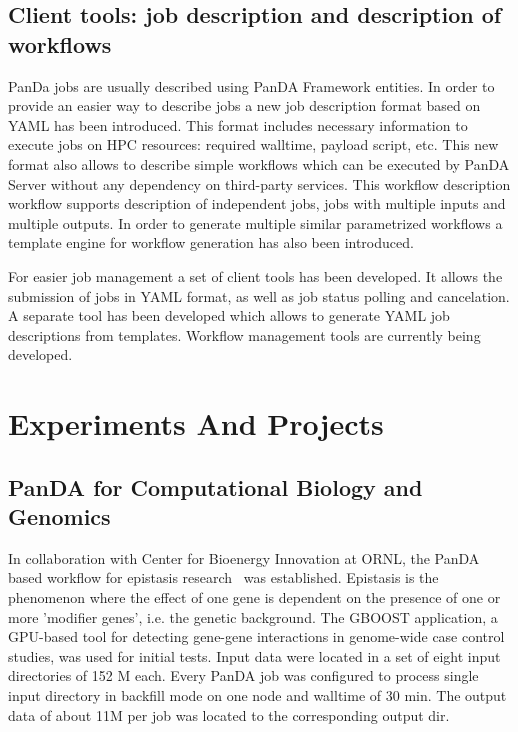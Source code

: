 \documentclass{webofc}
\begin{document}
\subsection{Client tools: job description and description of workflows}

PanDa jobs are usually described using PanDA Framework entities. In order to provide an easier way to describe jobs a new job description format based on YAML has been introduced. This format includes necessary information to execute jobs on HPC resources: required walltime, payload script, etc. This new format also allows to describe simple workflows which can be executed by PanDA Server without any dependency on third-party services. This workflow description workflow supports description of independent jobs, jobs with multiple inputs and multiple outputs. In order to generate multiple similar parametrized workflows a template engine for workflow generation has also been introduced.

For easier job management a set of client tools has been developed. It allows the submission of jobs in YAML format, as well as job status polling and cancelation. A separate tool has been developed which allows to generate YAML job descriptions from templates. Workflow management tools are currently being developed.



\section{Experiments And Projects}
\subsection{PanDA for Computational Biology and Genomics}

In collaboration with Center for Bioenergy Innovation at ORNL, the PanDA based workflow for epistasis research~\cite{GBOOST} was established. Epistasis is the phenomenon where the effect of one gene is dependent on the presence of one or more 'modifier genes', i.e. the genetic background. 
The GBOOST application, a GPU-based tool for detecting gene-gene interactions in genome-wide case control studies, was used for initial tests. Input data were located in a set of eight input directories of 152 M each. Every PanDA job was configured to process single input directory in backfill mode on one node and walltime of 30 min. The output data of about 11M per job was located to the corresponding output dir.  
\end{document}
